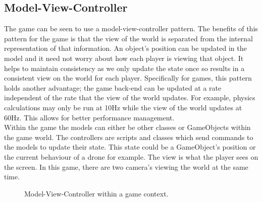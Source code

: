 \documentclass[11pt,a4paper]{article}
\begin{document}
\subsection{Model-View-Controller}
The game can be seen to use a model-view-controller pattern. The benefits of this pattern for the game is that the view of the world is separated from the internal representation of that information. An object's position can be updated in the model and it need not worry about how each player is viewing that object. It helps to maintain consistency as we only update the state once so results in a consistent view on the world for each player. Specifically for games, this pattern holds another advantage; the game back-end can be updated at a rate independent of the rate that the view of the world updates. For example, physics calculations may only be run at 10Hz while the view of the world updates at 60Hz. This allows for better performance management.\smallskip\\
Within the game the models can either be other classes or GameObjects within the game world. The controllers are scripts and classes which send commands to the models to update their state. This state could be a GameObject's position or the current behaviour of a drone for example. The view is what the player sees on the screen. In this game, there are two camera's viewing the world at the same time.
\begin{figure}[H]
    \caption{Model-View-Controller within a game context.}
    \label{fig:mvc}
\end{figure}
\end{document}
